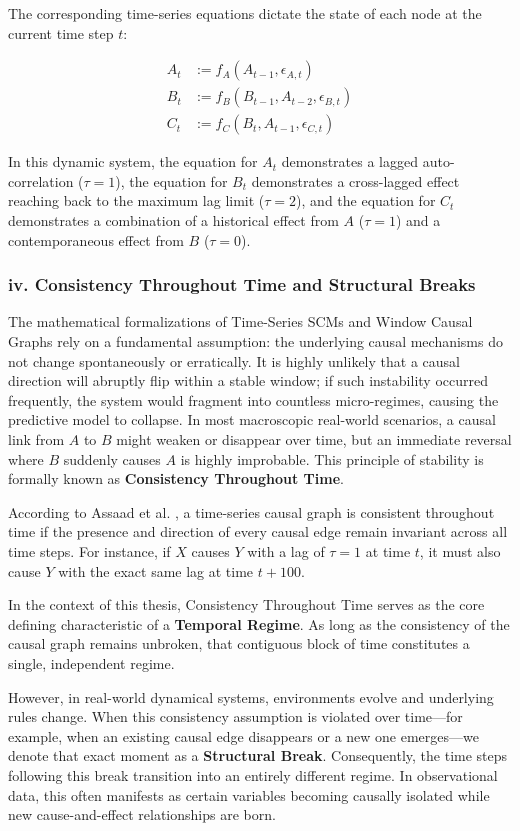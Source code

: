 The corresponding time-series equations dictate the state of each node at the current time step $t$:

\begin{align*}
A_t &:= f_A(A_{t-1}, \epsilon_{A,t}) \\
B_t &:= f_B(B_{t-1}, A_{t-2}, \epsilon_{B,t}) \\
C_t &:= f_C(B_t, A_{t-1}, \epsilon_{C,t})
\end{align*}

In this dynamic system, the equation for $A_t$ demonstrates a lagged auto-correlation ($\tau = 1$), the equation for $B_t$ demonstrates a cross-lagged effect reaching back to the maximum lag limit ($\tau = 2$), and the equation for $C_t$ demonstrates a combination of a historical effect from $A$ ($\tau = 1$) and a contemporaneous effect from $B$ ($\tau = 0$).

\subsubsection*{iv. Consistency Throughout Time and Structural Breaks}

The mathematical formalizations of Time-Series SCMs and Window Causal Graphs rely on a fundamental assumption: the underlying causal mechanisms do not change spontaneously or erratically. It is highly unlikely that a causal direction will abruptly flip within a stable window; if such instability occurred frequently, the system would fragment into countless micro-regimes, causing the predictive model to collapse. In most macroscopic real-world scenarios, a causal link from $A$ to $B$ might weaken or disappear over time, but an immediate reversal where $B$ suddenly causes $A$ is highly improbable. This principle of stability is formally known as \textbf{Consistency Throughout Time}.

According to Assaad et al. \cite{assaad2022survey}, a time-series causal graph is consistent throughout time if the presence and direction of every causal edge remain invariant across all time steps. For instance, if $X$ causes $Y$ with a lag of $\tau = 1$ at time $t$, it must also cause $Y$ with the exact same lag at time $t+100$. 

In the context of this thesis, Consistency Throughout Time serves as the core defining characteristic of a \textbf{Temporal Regime}. As long as the consistency of the causal graph remains unbroken, that contiguous block of time constitutes a single, independent regime. 

However, in real-world dynamical systems, environments evolve and underlying rules change. When this consistency assumption is violated over time—for example, when an existing causal edge disappears or a new one emerges—we denote that exact moment as a \textbf{Structural Break}. Consequently, the time steps following this break transition into an entirely different regime. In observational data, this often manifests as certain variables becoming causally isolated while new cause-and-effect relationships are born.

